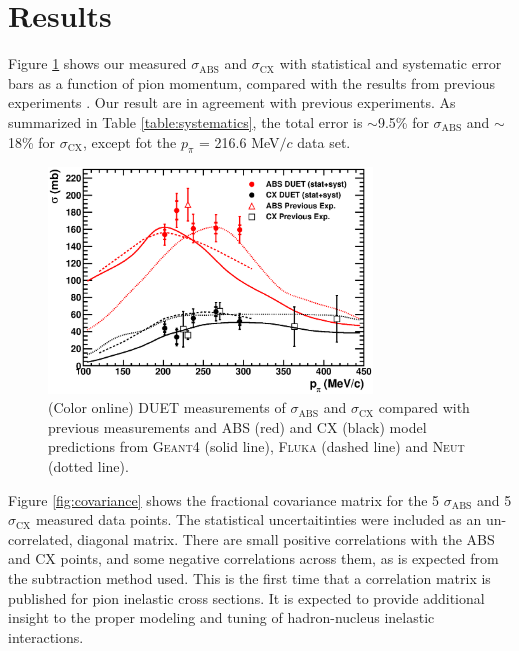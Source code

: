\section{Results}\label{sec:result}
Figure \ref{fig:result} shows our measured $\sigma_{\mathrm{ABS}}$ and $\sigma_{\mathrm{CX}}$ with statistical and systematic error bars as a function of pion momentum, compared with the results from previous experiments \cite{Bellotti1973,Ashery2,Bellotti1973_2,Jones}. Our result are in agreement with previous experiments. As summarized in Table \ref{table:systematics}, the total error is $\sim$9.5\% for $\sigma_{\mathrm{ABS}}$ and $\sim$18\% for $\sigma_{\mathrm{CX}}$, except fot the $p_{\pi}$ = 216.6 MeV$/c$ data set.

\begin{figure}[h]
\begin{center}
\includegraphics[width=86mm]{figures/duet_result_for_sep_paper.eps}
\caption{(Color online) DUET measurements of $\sigma_{\mathrm{ABS}}$ and $\sigma_{\mathrm{CX}}$ compared with previous measurements and ABS (red) and CX (black) model predictions from \textsc{Geant4} (solid line), \textsc{Fluka} (dashed line) and \textsc{Neut} (dotted line).}
\label{fig:result}
\end{center} 
\end{figure}

Figure \ref{fig:covariance} shows the fractional covariance matrix for the 5 $\sigma_{\mathrm{ABS}}$ and 5 $\sigma_{\mathrm{CX}}$ measured data points. The statistical uncertaitinties were included as an un-correlated, diagonal matrix. There are small positive correlations with the ABS and CX points, and some negative correlations across them, as is expected from the subtraction method used. This is the first time that a correlation matrix is published for pion inelastic cross sections. It is expected to provide additional insight to the proper modeling and tuning of hadron-nucleus inelastic interactions.

